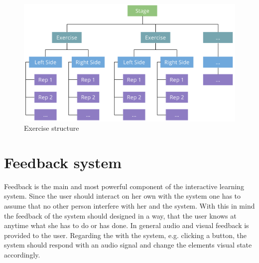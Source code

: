 \begin{figure}[htb]
	\centering
	\begin{minipage}[t]{1\linewidth}
		\centering
		\includegraphics[width=1\linewidth]{Pictures/exerciseStructureTopDown2}
		\caption{Exercise structure~\cite{MicrosoftHIG2014-mh}}
		\label{fig:exerciseStructure}
	\end{minipage}
\end{figure}

\section{Feedback system}\label{4_6_feedbackSystem}
Feedback is the main and most powerful component of the interactive learning system. Since the user should interact on her own with the system one has to assume that no other person interfere with her and the system. With this in mind the feedback of the system should designed in a way, that the user knows at anytime what she has to do or has done. In general audio and visual feedback is provided to the user. Regarding the \textbf{} with the system, e.g. clicking a button, the system should respond with an audio signal and change the elements visual state accordingly.

